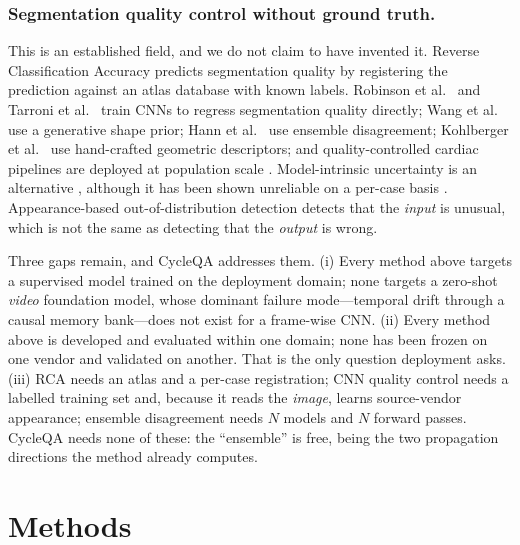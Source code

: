\documentclass[runningheads]{llncs}
\newcommand{\CQ}{CycleQA}
\begin{document}
\subsubsection{Segmentation quality control without ground truth.}
This is an established field, and we do not claim to have invented it. Reverse
Classification Accuracy \cite{valindria2017rca,robinson2017qc} predicts segmentation quality
by registering the prediction against an atlas database with known labels. Robinson et
al.~\cite{robinson2019qc} and Tarroni et al.~\cite{tarroni2019qc,tarroni2020qc} train CNNs to
regress segmentation quality directly; Wang et al.~\cite{wang2020genqc} use a generative
shape prior; Hann et al.~\cite{hann2021qc} use ensemble disagreement; Kohlberger et
al.~\cite{kohlberger2012} use hand-crafted geometric descriptors; and quality-controlled
cardiac pipelines are deployed at population scale \cite{ruijsink2020}. Model-intrinsic
uncertainty is an alternative \cite{kendall2017uncertainties,lakshminarayanan2017ensembles,roy2019},
although it has been shown unreliable on a per-case basis \cite{jungo2019}. Appearance-based
out-of-distribution detection \cite{hendrycks2017baseline,lee2018mahalanobis,gonzalez2022ood}
detects that the \emph{input} is unusual, which is not the same as detecting that the
\emph{output} is wrong.

Three gaps remain, and \CQ{} addresses them. (i) Every method above targets a supervised
model trained on the deployment domain; none targets a zero-shot \emph{video} foundation
model, whose dominant failure mode---temporal drift through a causal memory bank---does not
exist for a frame-wise CNN. (ii) Every method above is developed and evaluated within one
domain; none has been frozen on one vendor and validated on another. That is the only
question deployment asks. (iii) RCA needs an atlas and a per-case registration; CNN quality
control needs a labelled training set and, because it reads the \emph{image}, learns
source-vendor appearance; ensemble disagreement needs $N$ models and $N$ forward passes.
\CQ{} needs none of these: the ``ensemble'' is free, being the two propagation directions
the method already computes.


\section{Methods}
\end{document}
